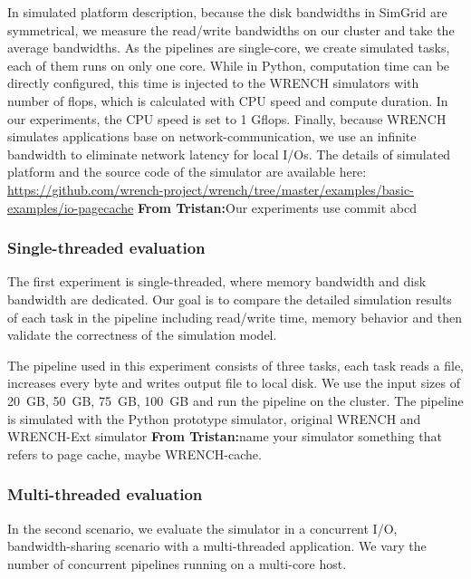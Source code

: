 \documentclass[conference]{IEEEtran}
\newcommand{\tristan}[1]{\color{orange}\textbf{From Tristan:}#1\color{black}}
\begin{document}
			In simulated platform description, because the disk bandwidths in SimGrid 
			are symmetrical, we measure the read/write bandwidths on our cluster and 
			take the average bandwidths. 
			As the pipelines are single-core, we create simulated tasks, 
			each of them runs on only one core. 
			While in Python, computation time can be directly configured, 
			this time is injected to the WRENCH simulators with number of flops, 
			which is calculated with CPU speed and compute duration. 
			In our experiments, the CPU speed is set to 1 Gflops. 
			Finally, because WRENCH simulates applications base on network-communication, 
			we use an infinite bandwidth to eliminate network latency for local I/Os.
			The details of simulated platform and the source code of the simulator 
			are available here: 
			\url{https://github.com/wrench-project/wrench/tree/master/examples/basic-examples/io-pagecache}
			\tristan{Our experiments use commit abcd}
			
			\subsubsection{Single-threaded evaluation}
			
			The first experiment is single-threaded, where memory bandwidth 
			and disk bandwidth are dedicated. 
			Our goal is to compare the detailed simulation results of each task 
			in the pipeline including read/write time, memory behavior and 
			then validate the correctness of the simulation model. 

			The pipeline used in this experiment consists of three tasks, 
			each task reads a file, increases every byte and writes output file 
			to local disk. 
			We use the input sizes of 20~GB, 50~GB, 75~GB, 100~GB and run 
			the pipeline on the cluster.
			The pipeline is simulated with the Python prototype simulator, 
			original WRENCH and WRENCH-Ext simulator \tristan{name your simulator something 
			that refers to page cache, maybe WRENCH-cache}. 
			
			\subsubsection{Multi-threaded evaluation}

			In the second scenario, we evaluate the simulator in a concurrent I/O, 
			bandwidth-sharing scenario with a multi-threaded application. 			
			We vary the number of concurrent pipelines running on a multi-core host.  
			
\end{document}
